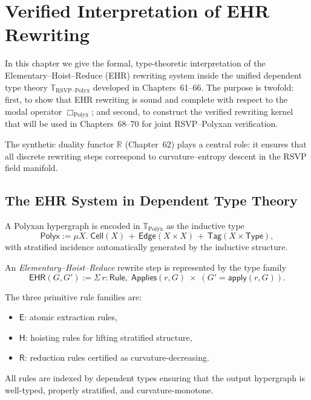 \chapter{Verified Interpretation of EHR Rewriting}
\label{ch:67}

In this chapter we give the formal, type-theoretic interpretation of the 
Elementary–Hoist–Reduce (EHR) rewriting system inside the unified dependent 
type theory $\mathbb{T}_{\mathrm{RSVP\text{--}Polyx}}$ developed in 
Chapters~61--66.  
The purpose is twofold: first, to show that EHR rewriting is sound and complete 
with respect to the modal operator $\Box_{\mathrm{Polyx}}$; and second, to 
construct the verified rewriting kernel that will be used in 
Chapters~68--70 for joint RSVP--Polyxan verification.

\bigskip
\noindent
The synthetic duality functor $\mathbb{R}$ (Chapter~62) plays a central role: 
it ensures that all discrete rewriting steps correspond to curvature–entropy 
descent in the RSVP field manifold.

\section{The EHR System in Dependent Type Theory}

A Polyxan hypergraph is encoded in $\mathbb{T}_{\mathrm{Polyx}}$ as the inductive type
\[
\mathsf{Polyx} := \mu X.\;
  \mathsf{Cell}(X)
  \,+\, \mathsf{Edge}(X \times X)
  \,+\, \mathsf{Tag}(X \times \mathsf{Type}),
\]
with stratified incidence automatically generated by the inductive structure.

\begin{definition}
An \emph{Elementary--Hoist--Reduce} rewrite step is represented by the type family
\[
\mathsf{EHR}(G,G')
  := \Sigma\,r:\mathsf{Rule},\;
     \mathsf{Applies}(r,G)\;\times\; (G' = \mathsf{apply}(r,G)).
\]
\end{definition}

The three primitive rule families are:

\begin{itemize}
\item $\mathsf{E}$: atomic extraction rules,
\item $\mathsf{H}$: hoisting rules for lifting stratified structure,
\item $\mathsf{R}$: reduction rules certified as curvature-decreasing.
\end{itemize}

All rules are indexed by dependent types ensuring that the output hypergraph is 
well-typed, properly stratified, and curvature-monotone.

